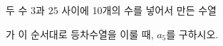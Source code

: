 두 수 $3$과 $25$ 사이에 10개의 수를 넣어서 만든 수열\par\smallskip{}\par\smallskip\noindent 가 이 순서대로 등차수열을 이룰 때, $a_5$를 구하시오.
